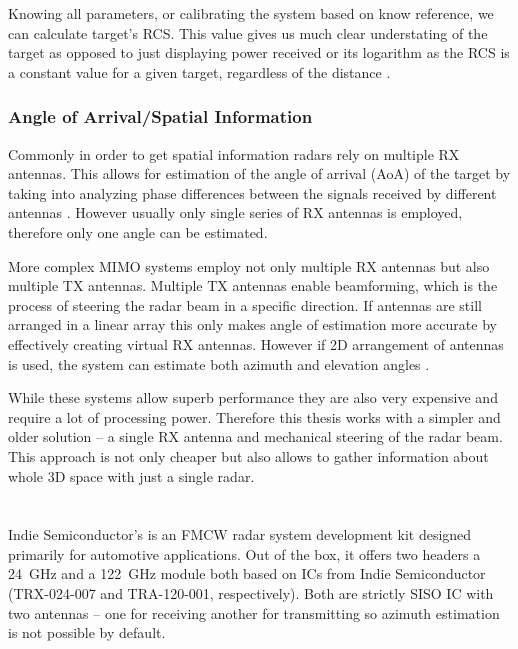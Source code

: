Knowing all parameters, or calibrating the system based on know reference, we can  calculate target's RCS.
This value gives us much clear understating of the target as opposed to just displaying power received or its logarithm as the RCS is a constant value for a given target, regardless of the distance \cite{richards2022}.

\subsection{Angle of Arrival/Spatial Information}

Commonly in order to get spatial information radars rely on multiple RX antennas.
This allows for estimation of the angle of arrival (AoA) of the target by taking into analyzing phase differences between the signals received by different antennas \cite{suleymanov2016}.
However usually only single series of RX antennas is employed, therefore only one angle can be estimated.

More complex MIMO systems employ not only multiple RX antennas but also multiple TX antennas.
Multiple TX antennas enable beamforming, which is the process of steering the radar beam in a specific direction.
If antennas are still arranged in a linear array this only makes angle of estimation more accurate by effectively creating virtual RX antennas.
However if 2D arrangement of antennas is used, the system can estimate both azimuth and elevation angles \cite{sandeep2018}.

While these systems allow superb performance they are also very expensive and require a lot of processing power.
Therefore this thesis works with a simpler and older solution -- a single RX antenna and mechanical steering of the radar beam.
This approach is not only cheaper but also allows to gather information about whole 3D space with just a single radar.


\chapter{\sidar}

Indie Semiconductor's \sidar is an FMCW radar system development kit designed primarily for automotive applications.
Out of the box, it offers two headers a 24~GHz and a 122~GHz module both based on ICs from Indie Semiconductor (TRX-024-007 and TRA-120-001, respectively).
Both are strictly SISO IC with two antennas -- one for receiving another for transmitting so azimuth estimation is not possible by default.

